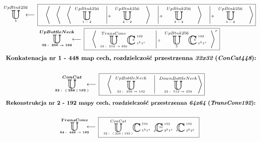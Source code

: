 \begin{equation*}
\begin{gathered}
\xunitdef{UpBtnk256}{5}{\quad
\xaggreg{\quad
\xaggreg{\quad
\xaggreg{\quad
\xunit{UpBtnk256}{1-2}{}
\quad \left|_+ \quad
\xunit{UpBtnk256}{2-2}{}
\right.\quad}
\quad \left|_+ \quad
\xunit{UpBtnk256}{3-2}{}
\right.\quad}
\quad \left|_+ \quad
\xunit{UpBtnk256}{4-2}{}
\right.\quad}}
\\
\xunitdef{\boldsymbol{UpBottleNeck}}{\boldsymbol{32:\ 256\rightarrow192}}{\quad
\xaggreg{\quad
\xunit{TransConv}{32:\ 512\rightarrow256}{}
\xconv{\ 1^k1^s}{\ 192}{}{}{b}
\quad \left|_+ \quad
\xunit{UpBtnk256}{5}{}
\xconv{\ 1^k1^s}{\ 192}{}{}{b}
\right.}^r}
\end{gathered}
\end{equation*}
\begin{equation*}
\begin{gathered}
\textbf{Konkatenacja nr 1 - 448 map cech, rozdzielczość przestrzenna $\textit{32x32}$ ($\textit{ConCat448}$):}
\\~\\
\xunitdef{\boldsymbol{ConCat}}{\boldsymbol{32:\ \langle \; 256 \; | \; 192 \; \rangle}}{\quad
\xaggreg{\quad
\xunit{UpBottleNeck}{32:\ 256\rightarrow192}{}
\quad \left| \quad
\xunit{DownBottleNeck}{32:\ 512\rightarrow256}{}
\right.}}
\end{gathered}
\end{equation*}
\begin{equation*}
\begin{gathered}
\textbf{Rekonstrukcja nr 2 - 192 mapy cech, rozdzielczość przestrzenna $\textit{64x64}$ ($\textit{TransConv192}$):}
\\~\\
\xunitdef{\boldsymbol{TransConv}}{\boldsymbol{64:\ 448\rightarrow192}}{\quad
\xunit{ConCat}{32:\ \langle \; 256 \; | \; 192 \; \rangle}{}
\xconv{\ 1^k1^s}{\ 192}{}{}{}
\xconv{\ 3^k1^s}{\ 192}{p}{}{br}
\xconv{\ 2^k2^s}{\ 192}{t}{}{}}
\end{gathered}
\end{equation*}
